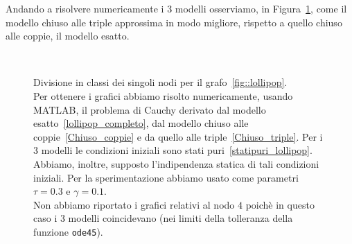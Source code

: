 Andando a risolvere numericamente i $3$ modelli osserviamo, in Figura~\ref{fig::confronto_modelli}, come il modello chiuso alle triple approssima in modo migliore, rispetto a quello chiuso alle coppie, il modello esatto.
\begin{figure}[!htb]
	\centering
{}
\\
\end{figure}
\begin{figure}
\ContinuedFloat
{}
\caption[Confronto tra il modello esatto, chiuso alle coppie e alle triple per il grafo~\ref{fig::lollipop}]
{Divisione in classi dei singoli nodi per il grafo~\ref{fig::lollipop}.\\
Per ottenere i grafici abbiamo risolto numericamente,  usando MATLAB, il problema di Cauchy derivato dal modello esatto~\eqref{lollipop_completo},  dal modello chiuso alle coppie~\eqref{Chiuso_coppie} e da quello alle triple~\eqref{Chiuso_triple}.
Per i $3$ modelli le condizioni iniziali sono stati puri~\eqref{statipuri_lollipop}. Abbiamo, inoltre,  supposto l'indipendenza statica di tali condizioni iniziali.
Per la sperimentazione abbiamo usato come parametri $\tau = 0.3$ e $\gamma = 0.1$.\\
Non abbiamo riportato i grafici relativi al nodo $4$ poich\`e in questo caso i 3 modelli coincidevano (nei limiti della tolleranza della funzione \texttt{ode45}).}
\label{fig::confronto_modelli}
\end{figure}

